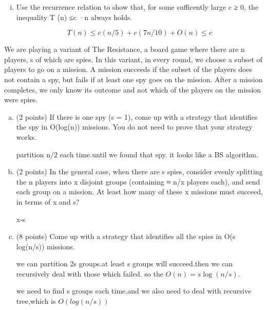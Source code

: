 \documentclass[11pt]{article}
\begin{document}
\begin{subparts}
\begin{enumerate}[i.]
        \item Use the recurrence relation to show that, for some sufficently large c ≥ 0, the
        inequality T (n) ≤c ·n always holds. \par
        \begin{solution}
            $$T(n)\leq c(n/5)+c(7n/10)+O(n) \leq c$$
        \end{solution}
    \end{enumerate}

    \item We are playing a variant of The Resistance, a board game where there are n players, s of which are spies. In this variant, in every round, we choose a subset of players to go on a mission. A mission succeeds if the subset of the players does not contain a spy, but fails if at least one spy goes on the mission. After a mission completes, we only know its outcome and not which of the players on the mission were spies. \par
    \begin{enumerate}[(a)]
        \item (2 points) If there is one spy (s = 1), come up with a strategy that identifies the spy in O(log(n)) missions. You do not need to prove that your strategy works. \par
        \begin{solution}
            partition n/2 each time.until we found that spy. it looks like a BS algorithm. \par
        \end{solution}
        
        \item (2 points) In the general case, when there are s spies, consider evenly splitting the n players into x disjoint groups (containing ≈ n/x players each), and send each group on a mission. At least how many of these x missions must succeed, in terms of x and s? \par
        \begin{solution}
            x-s
        \end{solution}

        \item (8 points) Come up with a strategy that identifies all the spies in O(s log(n/s)) missions. \par
        \begin{solution}
            we can partition 2s groups.at least s groups will succeed.then we can recursively deal with those which failed.
            so the $O(n)=s\log(n/s)$.\par
            we need to find s groups each time,and we also need to deal with recursive tree,which is $O(log(n/s))$
        \end{solution}
    \end{enumerate}


\end{subparts}
\end{document}
